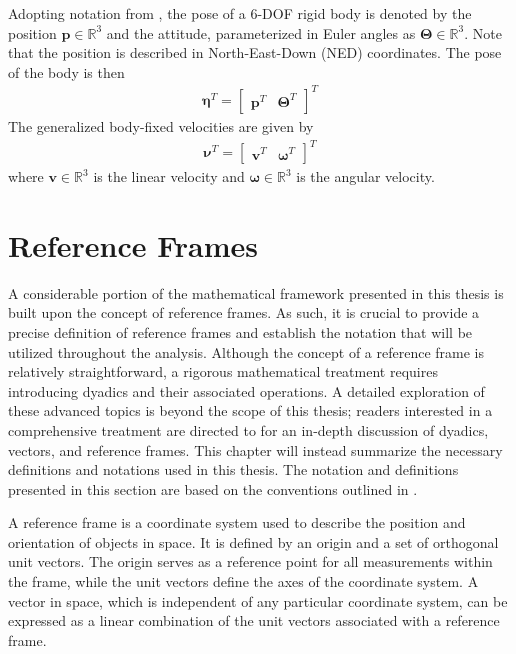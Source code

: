 Adopting notation from \cite{fossen2021}, the pose of a 6-DOF rigid body
is denoted by the position $\bm{p} \in \mathbb{R}^3$ and the attitude, parameterized
in Euler angles as $\bm{\Theta} \in \mathbb{R}^3$. Note that the position is
described in North-East-Down (NED) coordinates. The pose of the body is then
\begin{align}
    \bm{\eta}^T = \begin{bmatrix} \bm{p}^T & \bm{\Theta}^T \end{bmatrix}^T
\end{align}
The generalized body-fixed velocities are given by
\begin{align}
    \bm{\nu}^T = \begin{bmatrix} \bm{v}^T & \bm{\omega}^T \end{bmatrix}^T
\end{align}
where $\bm{v} \in \mathbb{R}^3$ is the linear velocity and $\bm{\omega} \in \mathbb{R}^3$
is the angular velocity.

\section{Reference Frames}
A considerable portion of the mathematical framework presented in this thesis
is built upon the concept of reference frames. As such, it is crucial to
provide a precise definition of reference frames and establish the notation
that will be utilized throughout the analysis. Although the concept of a
reference frame is relatively straightforward, a rigorous mathematical
treatment requires introducing dyadics and their associated operations. A
detailed exploration of these advanced topics is beyond the scope of this
thesis; readers interested in a comprehensive treatment are directed to \cite
{modsim} for an in-depth discussion of dyadics, vectors, and reference frames.
This chapter will instead summarize the necessary definitions and notations
used in this thesis. The notation and definitions presented in this section
are based on the conventions outlined in \cite{modsim}.

A reference frame is a coordinate system used to describe the position and
orientation of objects in space. It is defined by an origin and a set of
orthogonal unit vectors. The origin serves as a reference point for all
measurements within the frame, while the unit vectors define the axes of the
coordinate system. A vector in space, which is independent of any particular
coordinate system, can be expressed as a linear combination of the unit
vectors associated with a reference frame.  

